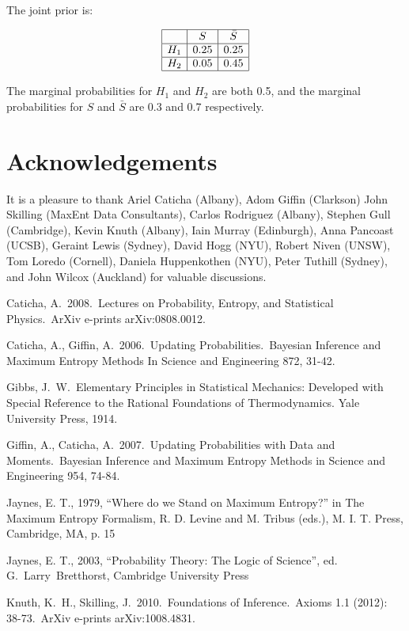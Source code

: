 \documentclass[a4paper, 11pt]{article}
\begin{document}
The joint prior is:

\begin{eqnarray}
\begin{array}{|c|c|c|}
\hline
	&	S	& \bar{S}\\
\hline
H_1 & 0.25  & 0.25\\
\hline
H_2 & 0.05 & 0.45\\
\hline
\end{array}
\end{eqnarray}

The marginal probabilities for $H_1$ and $H_2$ are both 0.5, and the
marginal probabilities for $S$ and $\bar{S}$ are 0.3 and 0.7 respectively.



\section*{Acknowledgements}
It is a pleasure to thank
Ariel Caticha (Albany),
Adom Giffin (Clarkson)
John Skilling (MaxEnt Data Consultants),
Carlos Rodriguez (Albany),
Stephen Gull (Cambridge),
Kevin Knuth (Albany),
Iain Murray (Edinburgh),
Anna Pancoast (UCSB),
Geraint Lewis (Sydney),
David Hogg (NYU),
Robert Niven (UNSW),
Tom Loredo (Cornell),
Daniela Huppenkothen (NYU),
Peter Tuthill (Sydney),
and John Wilcox (Auckland)
for valuable discussions.


\begin{thebibliography}{}
 Caticha, A.\ 2008.\ Lectures 
on Probability, Entropy, and Statistical Physics.\ ArXiv e-prints 
arXiv:0808.0012. 

 Caticha, A., 
Giffin, A.\ 2006.\ Updating Probabilities.\ Bayesian Inference and Maximum 
Entropy Methods In Science and Engineering 872, 31-42.

 Gibbs, J.~W.~Elementary Principles in
Statistical Mechanics: Developed with Special Reference to the Rational
Foundations of Thermodynamics. Yale University Press, 1914.

 Giffin, A., 
Caticha, A.\ 2007.\ Updating Probabilities with Data and Moments.\ Bayesian 
Inference and Maximum Entropy Methods in Science and Engineering 954, 
74-84.

 Jaynes, E. T., 1979, ``Where do we Stand on Maximum Entropy?'' in The Maximum Entropy Formalism, R. D. Levine and M. Tribus (eds.), M. I. T. Press, Cambridge, MA, p. 15

 Jaynes, E. T., 2003, ``Probability Theory:
The Logic of Science'', ed. G.~Larry~Bretthorst, Cambridge University Press

 Knuth, K.~H., 
Skilling, J.\ 2010.\ Foundations of Inference.\
Axioms 1.1 (2012): 38-73.\
ArXiv e-prints arXiv:1008.4831. 
\end{thebibliography}
\end{document}
